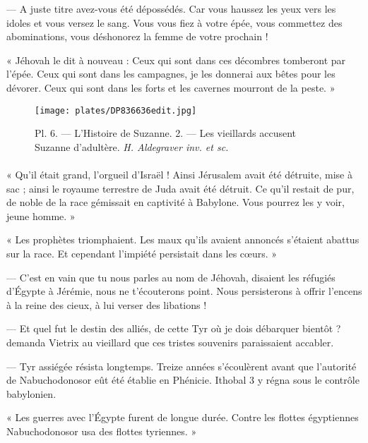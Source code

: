 \documentclass[a4paper, 11pt, oneside, polutonikogreek, french]{article}
\begin{document}
--- A juste titre avez-vous été dépossédés. Car vous haussez les yeux vers les idoles et vous versez le sang. Vous vous fiez à votre épée, vous commettez des abominations, vous déshonorez la femme de votre prochain !

« Jéhovah le dit à nouveau : Ceux qui sont dans ces décombres tomberont par l'épée. Ceux qui sont dans les campagnes, je les donnerai aux bêtes pour les dévorer. Ceux qui sont dans les forts et les cavernes mourront de la peste. »
\clearpage
\vspace*{\fill}
\begin{figure}[H]
\centering
\texttt{[image: plates/DP836636edit.jpg]}
\caption{\Fontauri Pl. 6. --- L'Histoire de Suzanne. 2. --- Les vieillards accusent Suzanne d'adultère. \emph{H. Aldegraver inv. et sc.}}
\end{figure}
\vspace*{\fill}
\clearpage
\paragraph{}
« Qu'il était grand, l'orgueil d'Israël ! Ainsi Jérusalem avait été détruite, mise à sac ; ainsi le royaume terrestre de Juda avait été détruit. Ce qu'il restait de pur, de noble de la race gémissait en captivité à Babylone. Vous pourrez les y voir, jeune homme. »

« Les prophètes triomphaient. Les maux qu'ils avaient annoncés s'étaient abattus sur la race. Et cependant l'impiété persistait dans les cœurs. »

--- C'est en vain que tu nous parles au nom de Jéhovah, disaient les réfugiés d'Égypte à Jérémie, nous ne t'écouterons point. Nous persisterons à offrir l'encens à la reine des cieux, à lui verser des libations !

\bigskip
\centerline{\EightStarTaper}
\centerline{\EightStarTaper\EightStarTaper}
\bigskip

--- Et quel fut le destin des alliés, de cette Tyr où je dois débarquer bientôt ? demanda Vietrix au vieillard que ces tristes souvenirs paraissaient accabler.

--- Tyr assiégée résista longtemps. Treize années s'écoulèrent avant que l'autorité de Nabuchodonosor eût été établie en Phénicie. Ithobal 3 y régna sous le contrôle babylonien.

« Les guerres avec l'Égypte furent de longue durée. Contre les flottes égyptiennes Nabuchodonosor usa des flottes tyriennes. »
\end{document}
